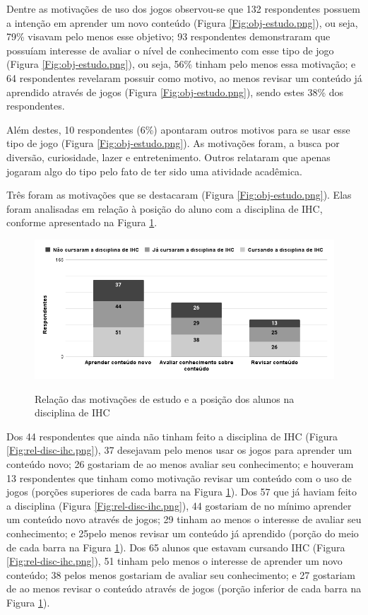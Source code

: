 Dentre as motivações de uso dos jogos observou-se que 132 respondentes possuem a intenção em aprender um novo conteúdo (Figura \ref{Fig:obj-estudo.png}), ou seja, 79\% visavam pelo menos esse objetivo; 93 respondentes demonstraram que possuíam interesse de avaliar o nível de conhecimento com esse tipo de jogo (Figura \ref{Fig:obj-estudo.png}), ou seja, 56\% tinham pelo menos essa motivação; e 64 respondentes revelaram possuir como motivo, ao menos revisar um conteúdo já aprendido através de jogos (Figura \ref{Fig:obj-estudo.png}), sendo estes 38\% dos respondentes. 

Além destes, 10 respondentes (6\%) apontaram outros motivos para se usar esse tipo de jogo (Figura \ref{Fig:obj-estudo.png}). As motivações foram, a busca por diversão, curiosidade, lazer e entretenimento. Outros relataram que apenas jogaram algo do tipo pelo fato de ter sido uma atividade acadêmica. 

Três foram as motivações que se destacaram (Figura \ref{Fig:obj-estudo.png}). Elas foram analisadas em relação à posição do aluno com a disciplina de IHC, conforme apresentado na Figura \ref{Fig:rel-disc-obj.png}.

\begin{figure}[htbp]
	\centering
	\caption{Relação das motivações de estudo e a posição dos alunos na disciplina de IHC}
	\includegraphics[keepaspectratio=true,scale=0.55]{figuras/resultados/rel-disc-obj.png}
	\label{Fig:rel-disc-obj.png}
\end{figure}

Dos 44 respondentes que ainda não tinham feito a disciplina de IHC (Figura \ref{Fig:rel-disc-ihc.png}), 37 desejavam pelo menos usar os jogos para aprender um conteúdo novo; 26 gostariam de ao menos avaliar seu conhecimento; e houveram 13 respondentes que tinham como motivação revisar um conteúdo com o uso de jogos (porções superiores de cada barra na Figura \ref{Fig:rel-disc-obj.png}). Dos 57 que já haviam feito a disciplina (Figura \ref{Fig:rel-disc-ihc.png}), 44 gostariam de no mínimo aprender um conteúdo novo através de jogos; 29 tinham ao menos o interesse de avaliar seu conhecimento; e 25pelo menos revisar um conteúdo já aprendido (porção do meio de cada barra na Figura \ref{Fig:rel-disc-obj.png}). Dos 65 alunos que estavam cursando IHC (Figura \ref{Fig:rel-disc-ihc.png}), 51 tinham pelo menos o interesse de aprender um novo conteúdo; 38 pelos menos gostariam de avaliar seu conhecimento; e 27 gostariam de ao menos revisar o conteúdo através de jogos (porção inferior de cada barra na Figura \ref{Fig:rel-disc-obj.png}).

